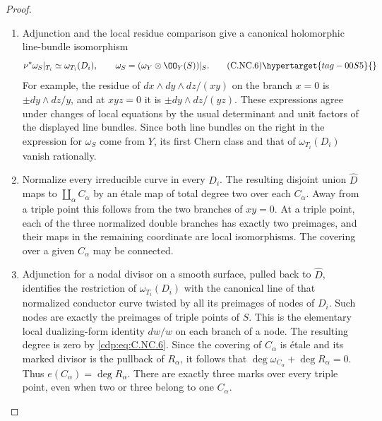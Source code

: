 \begin{proof}

\begin{enumerate}[label=\arabic*.,leftmargin=*]
\item Adjunction and the local residue comparison give a canonical holomorphic line-bundle isomorphism
\[
 \nu^*\omega_S|_{T_i}\simeq\omega_{T_i}(D_i),
 \qquad \omega_S=(\omega_Y\otimes\OO_Y(S))|_S.
 \tag{C.NC.6}\hypertarget{tag-00S5}{}\label{cdp:eq:C.NC.6}
\]
For example, the residue of $dx\wedge dy\wedge dz/(xy)$ on the branch $x=0$ is $\pm dy\wedge dz/y$, and at $xyz=0$ it is $\pm dy\wedge dz/(yz)$. These expressions agree under changes of local equations by the usual determinant and unit factors of the displayed line bundles. Since both line bundles on the right in the expression for $\omega_S$ come from $Y$, its first Chern class and that of $\omega_{T_i}(D_i)$ vanish rationally.

\item Normalize every irreducible curve in every $D_i$. The resulting disjoint union $\widehat D$ maps to $\coprod_\alpha C_\alpha$ by an étale map of total degree two over each $C_\alpha$. Away from a triple point this follows from the two branches of $xy=0$. At a triple point, each of the three normalized double branches has exactly two preimages, and their maps in the remaining coordinate are local isomorphisms. The covering over a given $C_\alpha$ may be connected.

\item Adjunction for a nodal divisor on a smooth surface, pulled back to $\widehat D$, identifies the restriction of $\omega_{T_i}(D_i)$ with the canonical line of that normalized conductor curve twisted by all its preimages of nodes of $D_i$. Such nodes are exactly the preimages of triple points of $S$. This is the elementary local dualizing-form identity $dw/w$ on each branch of a node. The resulting degree is zero by \eqref{cdp:eq:C.NC.6}. Since the covering of $C_\alpha$ is étale and its marked divisor is the pullback of $R_\alpha$, it follows that
$\deg\omega_{C_\alpha}+\deg R_\alpha=0$.
Thus $e(C_\alpha)=\deg R_\alpha$. There are exactly three marks over every triple point, even when two or three belong to one $C_\alpha$.


\end{enumerate}
\end{proof}

